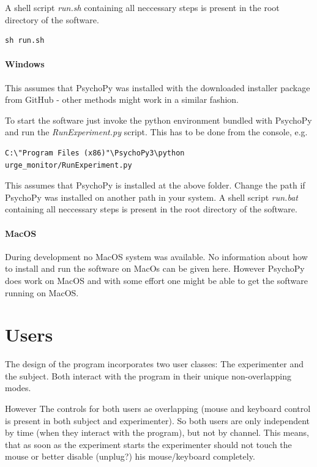 \documentclass[12pt,a4paper]{book}
\begin{document}
A shell script \emph{run.sh} containing all neccessary steps is present in the root directory of the software.

\begin{verbatim}
sh run.sh
\end{verbatim}

\paragraph{Windows}

This assumes that PsychoPy was installed with the downloaded installer package from GitHub - other methods might work in a similar fashion.

To start the software just invoke the python environment bundled with PsychoPy and run the \emph{RunExperiment.py} script. This has to be done from the console, e.g. 

\begin{verbatim}
C:\"Program Files (x86)"\PsychoPy3\python urge_monitor/RunExperiment.py
\end{verbatim}

This assumes that PsychoPy is installed at the above folder. Change the path if PsychoPy was installed on another path in your system.
A shell script \emph{run.bat} containing all neccessary steps is present in the root directory of the software.

\paragraph{MacOS}

During development no MacOS system was available. No information about how to install and run the software on MacOs can be given here. However PsychoPy does work on MacOS and with some effort one might be able to get the software running on MacOS.

\section{Users}

The design of the program incorporates two user classes: The experimenter and the subject. Both interact with the program in their unique non-overlapping modes.

However The controls for both users ae overlapping (mouse and keyboard control is present in both subject and experimenter). So both users are only independent by time (when they interact with the program), but not by channel. This means, that as soon as the experiment starts the experimenter should not touch the mouse or better disable (unplug?) his mouse/keyboard completely.
\end{document}
